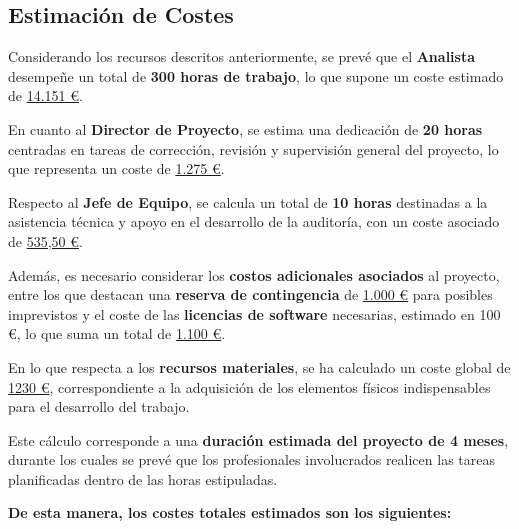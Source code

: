 \documentclass[a4paper, 11pt]{article}
\begin{document}
\subsection{Estimación de Costes}
\par\vspace{0.5cm}

Considerando los recursos descritos anteriormente, se prevé que el \textbf{Analista} desempeñe un total de \textbf{300 horas de trabajo}, lo que supone un coste estimado de \underline{14.151 €}.  
\par\vspace{0.3cm}

En cuanto al \textbf{Director de Proyecto}, se estima una dedicación de \textbf{20 horas} centradas en tareas de corrección, revisión y supervisión general del proyecto, lo que representa un coste de \underline{1.275 €}.  
\par\vspace{0.3cm}

Respecto al \textbf{Jefe de Equipo}, se calcula un total de \textbf{10 horas} destinadas a la asistencia técnica y apoyo en el desarrollo de la auditoría, con un coste asociado de \underline{535,50 €}.  
\par\vspace{0.3cm}

Además, es necesario considerar los \textbf{costos adicionales asociados} al proyecto, entre los que destacan una \textbf{reserva de contingencia} de \underline{1.000 €} para posibles imprevistos y el coste de las \textbf{licencias de software} necesarias, estimado en 100 €, lo que suma un total de \underline{1.100 €}.  
\par\vspace{0.3cm}

En lo que respecta a los \textbf{recursos materiales}, se ha calculado un coste global de \underline{1230 €}, correspondiente a la adquisición de los elementos físicos indispensables para el desarrollo del trabajo.  
\par\vspace{0.3cm}

Este cálculo corresponde a una \textbf{duración estimada del proyecto de 4 meses}, durante los cuales se prevé que los profesionales involucrados realicen las tareas planificadas dentro de las horas estipuladas.  

\par\vspace{0.5cm}
\textbf{De esta manera, los costes totales estimados son los siguientes:}  
\end{document}
